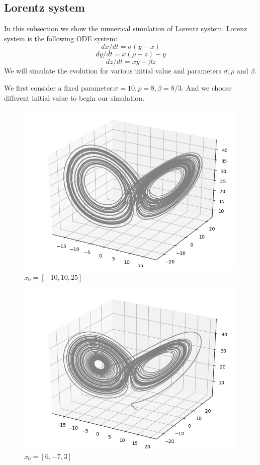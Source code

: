\documentclass{article}
\begin{document}
\subsection{Lorentz system}
In this subsection we show the numerical simulation of Lorentz system. Lorenz system is the following ODE system:
$$dx/dt = \sigma(y-x)$$
$$dy/dt = x(\rho - z) - y$$
$$dz/dt = xy - \beta z$$
We will simulate the evolution for various initial value and parameters $\sigma, \rho$ and $\beta$. 

We first consider a fixed parameter:$\sigma = 10, \rho = 8, \beta = 8/3$. And we choose different initial value to begin our simulation.

\begin{figure}[H]
	\centering
	\caption{$x_0 = [-10,10,25]$}
	\includegraphics[scale=0.5]{../1.png}
\end{figure}

\begin{figure}[H]
	\centering
	\caption{$x_0 = [6,-7,3]$}
\includegraphics[scale=0.5]{../2.png}
\end{figure}
\end{document}
